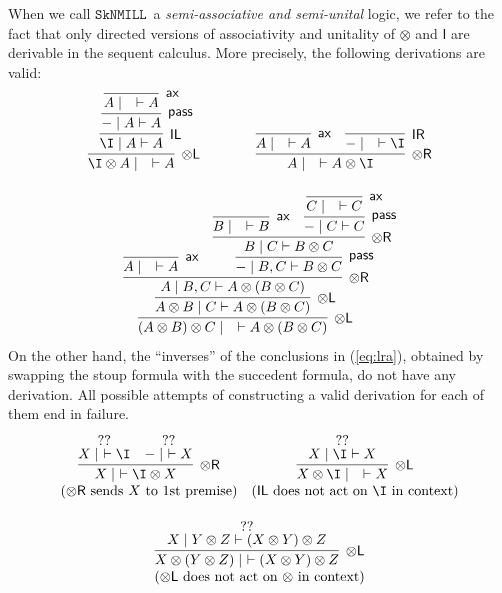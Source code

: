 \documentclass[sn-mathphys-num]{sn-jnl}%
\newcommand{\tl}{\otimes \mathsf{L}}
\newcommand{\tr}{\otimes\mathsf{R}}
\newcommand{\pass}{\mathsf{pass}}
\newcommand{\unitl}{\mathsf{IL}}
\newcommand{\unitr}{\mathsf{IR}}
\newcommand{\ax}{\mathsf{ax}}
\newcommand{\ot}{\otimes}
\newcommand{\unit}{\mathsf{I}}
\newcommand{\SkNMILL}{$\mathtt{SkNMILL}$}
\theoremstyle{thmstyleone}%
\theoremstyle{thmstyletwo}%
\theoremstyle{thmstylethree}%
\begin{document}
When we call \SkNMILL~a \emph{semi-associative and semi-unital} logic, we refer to the fact that only directed versions of associativity and unitality of $\ot$ and $\unit$ are derivable in the sequent calculus.
More precisely, the following derivations are valid:
\begin{equation}\label{eq:lra}
  \begin{array}{c}
  \infer[\tl]{\I \ot A \mid \quad \vdash A}{
    \infer[\unitl]{\I \mid A \vdash A}{
      \infer[\pass]{{-} \mid A \vdash A}{
        \infer[\ax]{A \mid \quad \vdash A}{}
      }
    }
  }
  \qquad \qquad
  \infer[\tr]{A \mid \quad \vdash A \ot \I}{
    \infer[\ax]{A \mid \quad \vdash A}{}
    &
    \infer[\unitr]{{-} \mid \quad \vdash \I}{}
  }
  \\[15pt]
  \infer[\tl]{(A \ot B) \ot C \mid \quad \vdash A \ot (B \ot C)}{
    \infer[\tl]{A \ot B \mid C \vdash A \ot (B \ot C)}{
      \infer[\tr]{A \mid B , C \vdash A \ot (B \ot C)}{
        \infer[\ax]{A \mid \quad \vdash A}{}
        &
        \infer[\pass]{{-} \mid B , C \vdash B \ot C}{
          \infer[\tr]{B \mid C \vdash B \ot C}{
            \infer[\ax]{B \mid \quad \vdash B}{}
            &
            \infer[\pass]{{-} \mid C \vdash C}{
              \infer[\ax]{C \mid \quad \vdash C}{}
            }
          }
        }
      }
    }
  }
  \end{array}
\end{equation}
On the other hand,  the ``inverses'' of the conclusions in (\ref{eq:lra}), obtained by swapping the stoup formula with the succedent formula, do not have any derivation. All possible attempts of constructing a valid derivation for each of them end in failure.
\begin{displaymath}
  \begin{array}{cc}
    \infer[\tr]{X \mid ~\vdash \I \ot X}{
      \deduce[??]{X \mid ~ \vdash \I}{
      }
      &
      \deduce[??]{{-} \mid ~ \vdash X}{
      }
    }
    &
    \infer[\tl]{X \ot \I \mid \quad \vdash X}{
      \deduce{X \mid \I \vdash X}{??}
    } \\
    (\text{$\tr$ sends $X$ to 1st premise}) &
    (\text{$\unitl$ does not act on $\I$ in context}) \\[15pt]
    \multicolumn{2}{c}{\infer[\tl]{X \ot (Y \ot Z) \mid ~\vdash (X \ot Y) \ot Z}{
      \deduce{X \mid Y \ot Z \vdash (X \ot Y) \ot Z}{??}
    }} \\
    \multicolumn{2}{c}{(\text{$\tl$ does not act on $\ot$ in context})}
  \end{array}
\end{displaymath}
\end{document}
